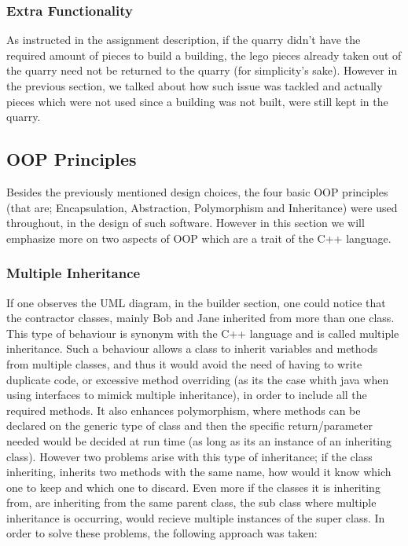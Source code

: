 \documentclass[12pt, A4]{report}
\begin{document}
			\subsubsection*{Extra Functionality}
			As instructed in the assignment description, if the quarry didn't have the required amount of pieces to build a building, the lego pieces already taken out of the quarry need not be returned to the quarry (for simplicity's sake). However in the previous section, we talked about how such issue was tackled and actually pieces which were not used since a building was not built, were still kept in the quarry.

		\subsection*{OOP Principles}
		Besides the previously mentioned design choices, the four basic OOP principles (that are; Encapsulation, Abstraction, Polymorphism and Inheritance) were used throughout, in the design of such software. However in this section we will emphasize more on two aspects of OOP which are a trait of the C++ language.

			\subsubsection*{Multiple Inheritance}
			If one observes the UML diagram, in the builder section, one could notice that the contractor classes, mainly Bob and Jane inherited from more than one class. This type of behaviour is synonym with the C++ language and is called multiple inheritance. Such a behaviour allows a class to inherit variables and methods from multiple classes, and thus it would avoid the need of having to write duplicate code, or excessive method overriding (as its the case whith java when using interfaces to mimick multiple inheritance), in order to include all the required methods. It also enhances polymorphism, where methods can be declared on the generic type of class and then the specific return/parameter needed would be decided at run time (as long as its an instance of an inheriting class). However two problems arise with this type of inheritance; if the class inheriting, inherits two methods with the same name, how would it know which one to keep and which one to discard. Even more if the classes it is inheriting from, are inheriting from the same parent class, the sub class where multiple inheritance is occurring, would recieve multiple instances of the super class. In order to solve these problems, the following approach was taken:
\end{document}
